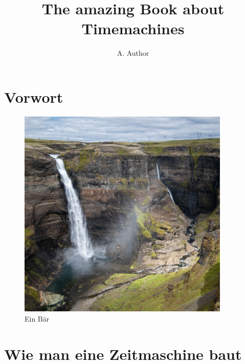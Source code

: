 \documentclass[
a5paper,
10pt, 
onecolumn,
openany,
]{memoir}
\author{\sffamily\huge A. Author}
\title{\sffamily\Huge The amazing Book about Timemachines}
\date{}
\begin{document}

\frontmatter

\maketitle

\clearpage

\tableofcontents*

\clearpage

\chapter{Vorwort}

\lipsum[1-2]

\begin{figure}
  \centering
  \includegraphics[width=0.9\textwidth]{fotos/a}
  \caption{Ein Bär}
\end{figure}

\lipsum[1-2]

\mainmatter

\chapter{Wie man eine Zeitmaschine baut}
\end{document}
